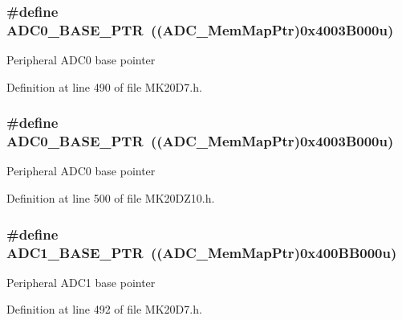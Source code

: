 \subsubsection[{\texorpdfstring{A\+D\+C0\+\_\+\+B\+A\+S\+E\+\_\+\+P\+TR}{ADC0_BASE_PTR}}]{\setlength{\rightskip}{0pt plus 5cm}\#define A\+D\+C0\+\_\+\+B\+A\+S\+E\+\_\+\+P\+TR~(({\bf A\+D\+C\+\_\+\+Mem\+Map\+Ptr})0x4003\+B000u)}\hypertarget{group___a_d_c___peripheral_ga6cec2f227a3a37a9fccaa830740f1f5e}{}\label{group___a_d_c___peripheral_ga6cec2f227a3a37a9fccaa830740f1f5e}
Peripheral A\+D\+C0 base pointer 

Definition at line 490 of file M\+K20\+D7.\+h.

\subsubsection[{\texorpdfstring{A\+D\+C0\+\_\+\+B\+A\+S\+E\+\_\+\+P\+TR}{ADC0_BASE_PTR}}]{\setlength{\rightskip}{0pt plus 5cm}\#define A\+D\+C0\+\_\+\+B\+A\+S\+E\+\_\+\+P\+TR~(({\bf A\+D\+C\+\_\+\+Mem\+Map\+Ptr})0x4003\+B000u)}\hypertarget{group___a_d_c___peripheral_ga6cec2f227a3a37a9fccaa830740f1f5e}{}\label{group___a_d_c___peripheral_ga6cec2f227a3a37a9fccaa830740f1f5e}
Peripheral A\+D\+C0 base pointer 

Definition at line 500 of file M\+K20\+D\+Z10.\+h.

\subsubsection[{\texorpdfstring{A\+D\+C1\+\_\+\+B\+A\+S\+E\+\_\+\+P\+TR}{ADC1_BASE_PTR}}]{\setlength{\rightskip}{0pt plus 5cm}\#define A\+D\+C1\+\_\+\+B\+A\+S\+E\+\_\+\+P\+TR~(({\bf A\+D\+C\+\_\+\+Mem\+Map\+Ptr})0x400\+B\+B000u)}\hypertarget{group___a_d_c___peripheral_ga7fb56938ede79eea2065c4294db3b2d3}{}\label{group___a_d_c___peripheral_ga7fb56938ede79eea2065c4294db3b2d3}
Peripheral A\+D\+C1 base pointer 

Definition at line 492 of file M\+K20\+D7.\+h.

